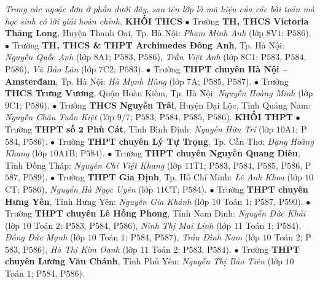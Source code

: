 \begin{multicols}{2}
	\textit{Trong các ngoặc đơn ở phần dưới đây, sau tên lớp là mã hiệu của các bài toán mà học sinh có lời giải hoàn chỉnh.}
	\vskip 0.05cm
	\textbf{\color{thachthuctoanhoc}KHỐI THCS}
	\vskip 0.05cm
	$\bullet$ Trường \textbf{\color{thachthuctoanhoc}TH, THCS Victoria Thăng Long}, Huyện Thanh Oai, Tp. Hà Nội: \textit{Phạm Minh Anh} (lớp $8$V$1$; P$586$).
	\vskip 0.05cm
	$\bullet$ Trường \textbf{\color{thachthuctoanhoc}TH, THCS \& THPT Archimedes Đông Anh}, Tp. Hà Nội: \textit{Nguyễn Quốc Anh} (lớp $8$A$1$; P$583$, P$586$), \textit{Trần Việt Anh} (lớp $8$C$1$; P$583$, P$584$, P$586$), \textit{Vũ Bảo Lân} (lớp $7$C$2$; P$583$).
	\vskip 0.05cm
	$\bullet$ Trường \textbf{\color{thachthuctoanhoc}THPT chuyên Hà Nội -- Amsterđam}, Tp. Hà Nội: \textit{Hà Mạnh Hùng} (lớp $7$A; P$585$, P$587$).
	\vskip 0.05cm
	$\bullet$ Trường \textbf{\color{thachthuctoanhoc}THCS Trưng Vương}, Quận Hoàn Kiếm, Tp. Hà Nội: \textit{Nguyễn Hoàng Minh} (lớp $9$C$1$; P$586$).
	\vskip 0.05cm
	$\bullet$ Trường \textbf{\color{thachthuctoanhoc}THCS Nguyễn Trãi}, Huyện Đại Lộc, Tỉnh Quảng Nam: \textit{Nguyễn Châu Tuấn Kiệt} (lớp $9/7$; P$583$, P$584$, P$585$, P$586$).
	\vskip 0.05cm
	\textbf{\color{thachthuctoanhoc}KHỐI THPT}
	\vskip 0.05cm
	$\bullet$ Trường \textbf{\color{thachthuctoanhoc}THPT số $\pmb{2}$ Phù Cát}, Tỉnh Bình Định: \textit{Nguyễn Hữu Trí} (lớp $10$A$1$; P$584$, P$586$).
	\vskip 0.05cm
	$\bullet$ Trường \textbf{\color{thachthuctoanhoc}THPT chuyên Lý Tự Trọng}, Tp. Cần Thơ: \textit{Đặng Hoàng Khang} (lớp $10$A$1$B; P$584$).
	\vskip 0.05cm
	$\bullet$ Trường \textbf{\color{thachthuctoanhoc}THPT chuyên Nguyễn Quang Diêu}, Tỉnh Đồng Tháp: \textit{Nguyễn Chí Việt Khang} (lớp $11$T$1$; P$583$, P$584$, P$585$, P$586$, P$587$, P$589$).
	\vskip 0.05cm
	$\bullet$ Trường \textbf{\color{thachthuctoanhoc}THPT Gia Định}, Tp. Hồ Chí Minh: \textit{Lê Anh Khoa} (lớp $10$CT; P$586$), \textit{Nguyễn Hà Ngọc Uyên} (lớp $11$CT; P$584$).
	\vskip 0.05cm
	$\bullet$ Trường \textbf{\color{thachthuctoanhoc}THPT chuyên Hưng Yên}, Tỉnh Hưng Yên: \textit{Nguyễn Gia Khánh} (lớp $10$ Toán $1$; P$587$, P$590$).
	\vskip 0.05cm
	$\bullet$ Trường \textbf{\color{thachthuctoanhoc}THPT chuyên Lê Hồng Phong}, Tỉnh Nam Định: \textit{Nguyễn Đức Khải} (lớp $10$ Toán $2$; P$583$, P$584$, P$586$), \textit{Ninh Thị Mai Linh} (lớp $11$ Toán $1$; P$584$), \textit{Đồng Đức Mạnh} (lớp $10$ Toán $1$; P$584$, P$587$), \textit{Trần Đình Nam} (lớp $10$ Toán $2$; P$583$, P$586$), \textit{Hà Thị Kim Oanh} (lớp $11$ Toán $2$; P$583$, P$584$).
	\vskip 0.05cm
	$\bullet$ Trường \textbf{\color{thachthuctoanhoc}THPT chuyên Lương Văn Chánh}, Tỉnh Phú Yên: \textit{Nguyễn Thị Bảo Tiên} (lớp $10$ Toán $1$; P$584$, P$586$).

\end{multicols}

